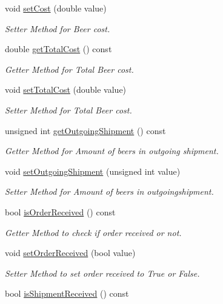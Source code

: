 \begin{DoxyCompactItemize}
void \hyperlink{classPlayer_a2fd1430d641ef17c52b0aae31e7e26bf}{set\+Cost} (double value)
\begin{DoxyCompactList}\small\item\em Setter Method for Beer cost. \end{DoxyCompactList}\item 
double \hyperlink{classPlayer_a0c5cd74a628ad6fb79ebb790dd1a956b}{get\+Total\+Cost} () const
\begin{DoxyCompactList}\small\item\em Getter Method for Total Beer cost. \end{DoxyCompactList}\item 
void \hyperlink{classPlayer_ab79475527bb480b01d004106580158b5}{set\+Total\+Cost} (double value)
\begin{DoxyCompactList}\small\item\em Setter Method for Total Beer cost. \end{DoxyCompactList}\item 
unsigned int \hyperlink{classPlayer_afd54f2f323e1430efda2acd30163e7ff}{get\+Outgoing\+Shipment} () const
\begin{DoxyCompactList}\small\item\em Getter Method for Amount of beers in outgoing shipment. \end{DoxyCompactList}\item 
void \hyperlink{classPlayer_aeed18c6e38773f2c8035b8604b38df29}{set\+Outgoing\+Shipment} (unsigned int value)
\begin{DoxyCompactList}\small\item\em Setter Method for Amount of beers in outgoingshipment. \end{DoxyCompactList}\item 
bool \hyperlink{classPlayer_a5be8afcdfb75792e300d9c255d058a05}{is\+Order\+Received} () const
\begin{DoxyCompactList}\small\item\em Getter Method to check if order received or not. \end{DoxyCompactList}\item 
void \hyperlink{classPlayer_abb73217aac5315b6d78c58feb25a88df}{set\+Order\+Received} (bool value)
\begin{DoxyCompactList}\small\item\em Setter Method to set order received to True or False. \end{DoxyCompactList}\item 
bool \hyperlink{classPlayer_ad3834057ec43f27a631d24f276586265}{is\+Shipment\+Received} () const

\end{DoxyCompactItemize}
